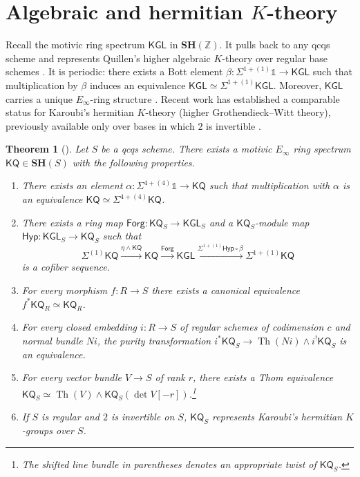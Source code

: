 \documentclass[11pt,hyp,english]{article}
\newcommand{\Z}{\mathbb{Z}}
\newcommand{\unit}{\mathds{1}}
\newcommand{\KGL}{\mathsf{KGL}}
\newcommand{\KQ}{\mathsf{KQ}}
\newcommand{\SH}{\mathbf{SH}}
\newcommand{\Th}{\operatorname{Th}}
\newcommand{\Forg}{\mathsf{Forg}}
\newcommand{\Hyper}{\mathsf{Hyp}}
\let\smash=\wedge
\newtheorem{theorem}{Theorem}[section]
\theoremstyle{definition}
\begin{document}
\section{Algebraic and hermitian $K$-theory}
\label{aandh}

Recall the motivic ring spectrum $\KGL$ in $\SH(\Z)$. 
It pulls back to any qcqs scheme and represents Quillen’s higher algebraic $K$-theory 
over regular base schemes \cite{ppr,rso.strict,voevodsky.icm}. 
It is periodic: there exists a Bott element
$\beta:\Sigma^{1+(1)}\unit\to \KGL$
such that multiplication by $\beta$ induces an equivalence $\KGL \simeq \Sigma^{1+(1)}\KGL$. Moreover, $\KGL$ carries a unique $E_\infty$-ring structure \cite{zbMATH06483840}.
Recent work has established a comparable status for Karoubi’s hermitian $K$-theory (higher Grothendieck–Witt theory), previously available only over bases in which $2$ is invertible \cite{hornbostel}.


\begin{theorem}[\cite{chn}]\label{thm:chn}
Let $S$ be a qcqs scheme. 
There exists a motivic $E_{\infty}$ ring spectrum $\KQ\in \SH(S)$ with the following properties.
\begin{enumerate}
    \item There exists an element $\alpha:\Sigma^{4+(4)}\unit\to \KQ$ such that multiplication with $\alpha$ is an equivalence $\KQ \simeq \Sigma^{4+(4)}\KQ$.
    \item\label{item:wood-seq} There exists a ring map $\Forg\colon \KQ_S\to \KGL_S$ and a $\KQ_S$-module map $\Hyper\colon \KGL_S\to \KQ_S$ such that \[ \Sigma^{(1)} \KQ \xrightarrow{\eta\smash \KQ} \KQ \xrightarrow{\Forg} \KGL \xrightarrow{\Sigma^{1+(1)}\Hyper \circ \beta} \Sigma^{1+(1)}\KQ \] is a cofiber sequence.
    \item For every morphism $f\colon R\to S$ there exists a canonical equivalence $f^\ast \KQ_R\simeq \KQ_R$.
    \item For every closed embedding $i\colon R\to S$ of regular schemes of codimension $c$ and normal bundle $Ni$, the purity transformation $i^\ast\KQ_S\to \Th(Ni)\smash i^!\KQ_S$ is an equivalence.
    \item For every vector bundle $V\to S$ of rank $r$, there exists a Thom equivalence $\KQ_S\simeq \Th(V)\smash \KQ_S(\det V[-r])$.\footnote{The shifted line bundle in parentheses denotes an appropriate twist of $\KQ_S$.}
    \item If $S$ is regular and $2$ is invertible on $S$, $\KQ_S$ represents Karoubi's hermitian $K$-groups over $S$.
\end{enumerate}
\end{theorem}
\end{document}
